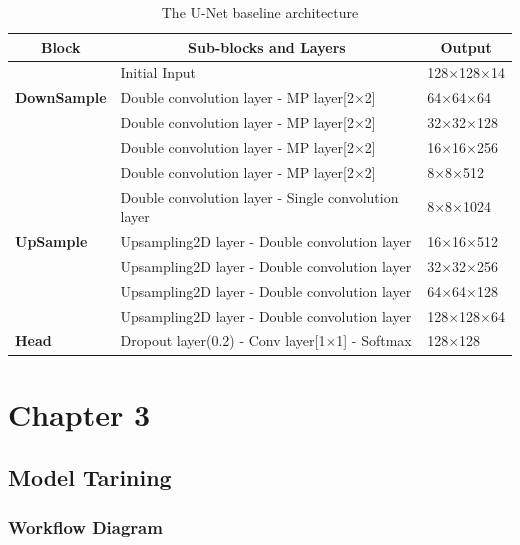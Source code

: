 \documentclass[12pt,a4paper]{report}
\begin{document}
    
\begin{table}[h]
    \centering
\begin{center}
\begin{tabular}{|p{2.57cm}|l|p{2.2cm}|}
\hline
\multicolumn{1}{|c|}{\textbf{Block}} & \multicolumn{1}{c|}{\textbf{Sub-blocks and Layers}} & \multicolumn{1}{c|}{\textbf{Output}} \\
\hline
\textbf{} & Initial Input & 128×128×14 \\
\textbf{DownSample} & Double convolution layer - MP layer[2×2] & 64×64×64 \\
 & Double convolution layer - MP layer[2×2] & 32×32×128 \\
 & Double convolution layer - MP layer[2×2] & 16×16×256 \\
 & Double convolution layer - MP layer[2×2] & 8×8×512 \\
 & Double convolution layer - Single convolution layer & 8×8×1024 \\
\hline
\textbf{UpSample} & Upsampling2D layer - Double convolution layer & 16×16×512 \\
 & Upsampling2D layer - Double convolution layer & 32×32×256 \\
 & Upsampling2D layer - Double convolution layer & 64×64×128 \\
 & Upsampling2D layer - Double convolution layer & 128×128×64 \\
\hline
\textbf{Head} & Dropout layer(0.2) - Conv layer[1×1] - Softmax & 128×128 \\
\hline
\end{tabular}
\end{center}
    \caption{The U-Net baseline architecture \cite{ra_unet}}
    \label{tab:abbreviations}
\end{table} 


		

		{\vfill \chapter*{\centering \vfill Chapter 3 \vfill}\vfill}
		\thispagestyle{empty}
		\newpage
		\label{Model Tarining}
		\section{Model Tarining }

		\label{Workflow Diagram}
		\subsection{Workflow Diagram}
\end{document}

